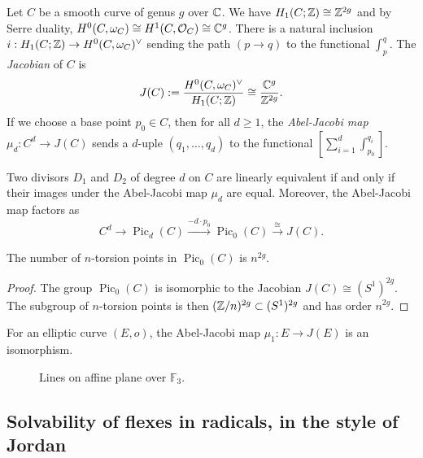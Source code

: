 \documentclass[11pt]{amsart}
\begin{document}
Let $C$ be a smooth curve of genus $g$ over $\mathbb{C}$. We have $H_1(C;\mathbb{Z}) \cong \mathbb{Z}^{2g}$ and by Serre duality, $H^0(C, \omega_C) \cong H^1(C, \mathcal{O}_C) \cong \mathbb{C}^g$. There is a natural inclusion $i: H_1(C;\mathbb{Z}) \to H^0(C, \omega_C)^\vee$ sending the path $(p\to q)$ to the functional $\int_p^q$. The \textit{Jacobian} of $C$ is $$J(C):= \frac{H^0(C, \omega_C)^\vee}{H_1(C; \mathbb{Z})} \cong \frac{\mathbb{C}^g}{\mathbb{Z}^{2g}}.$$
If we choose a base point $p_0\in C$, then for all $d\geq 1$, the \textit{Abel-Jacobi map} $\mu_d: C^d\to J(C)$ sends a $d$-uple $(q_1, \dots, q_d)$ to the functional $\left[\sum_{i = 1}^d \int_{p_0}^{q_i}\right]$.
\begin{theorem}
    Two divisors $D_1$ and $D_2$ of degree $d$ on $C$ are linearly equivalent if and only if their images under the Abel-Jacobi map $\mu_d$ are equal. Moreover, the Abel-Jacobi map factors as $$C^d\to \operatorname{Pic}_d(C)\overset{-d\cdot p_0}{\longrightarrow} \operatorname{Pic}_0(C) \overset{\cong}{\to} J(C).$$
\end{theorem}
\begin{corollary}
    The number of $n$-torsion points in $\operatorname{Pic}_0(C)$ is $n^{2g}$.
\end{corollary}

\begin{proof}
    The group $\operatorname{Pic}_0(C)$ is isomorphic to the Jacobian $J(C)\cong (S^1)^{2g}$. The subgroup of $n$-torsion points is then $(\mathbb{Z}/n)^{2g} \subset (S^1)^{2g}$ and has order $n^{2g}$.
\end{proof}

\begin{proposition}
    For an elliptic curve $(E, o)$, the Abel-Jacobi map $\mu_1: E \to J(E)$ is an isomorphism. 
\end{proposition}

\begin{figure}[H]
    
    \caption{Lines on affine plane over $\mathbb{F}_3$.}
    \label{fig: A2 F3}
\end{figure}


\subsection{Solvability of flexes in radicals, in the style of Jordan}
\end{document}
